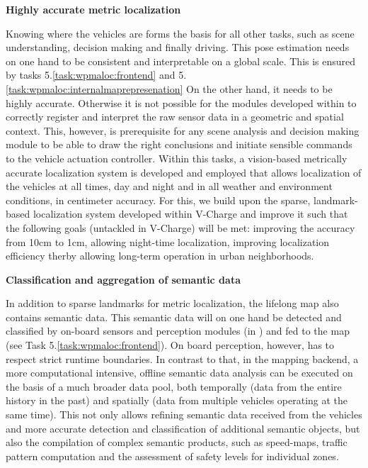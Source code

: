 {\begin{tasks}{\WPMappingNo}
\item {\bf Highly accurate metric localization}
\label{task:wpmaloc:localization}
\taskpartner{\ETHZ}

Knowing where the vehicles are forms the basis for all other tasks, such as scene understanding, decision making and finally driving. This pose estimation needs on one hand to be consistent and interpretable on a global scale. This is ensured by tasks 5.\ref{task:wpmaloc:frontend} and 5.\ref{task:wpmaloc:internalmaprepresenation} On the other hand, it needs to be highly accurate. Otherwise it is not possible for the modules developed within \WPPerception to correctly register and interpret the raw sensor data in a geometric and spatial context. This, however, is prerequisite for any scene analysis and decision making module to be able to draw the right conclusions and initiate sensible commands to the vehicle actuation controller. Within this tasks, a vision-based metrically accurate localization system is developed and employed that allows localization of the vehicles at all times, day and night and in all weather and environment conditions, in centimeter accuracy. For this, we build upon the sparse, landmark-based localization system developed within V-Charge and improve it such that the following goals (untackled in V-Charge) will be met: improving the accuracy from 10cm to 1cm, allowing night-time localization, improving localization efficiency therby allowing long-term operation in urban neighborhoods.


\item {\bf Classification and aggregation of semantic data}
\label{task:wpmaloc:semantic}
\taskpartners{\IBM}{\ETHZ}
  
In addition to sparse landmarks for metric localization, the lifelong map also contains semantic data. This semantic data will on one hand be detected and classified by on-board sensors and perception modules (in \WPPerception{}) and fed to the map (see Task 5.\ref{task:wpmaloc:frontend}). On board perception, however, has to respect strict runtime boundaries. In contrast to that, in the mapping backend, a more computational intensive, offline semantic data analysis can be executed on the basis of a much broader data pool, both temporally (data from the entire history in the past) and spatially (data from multiple vehicles operating at the same time). This not only allows refining semantic data received from the vehicles and more accurate detection and classification of additional semantic objects, but also the compilation of complex semantic products, such as speed-maps, traffic pattern computation and the assessment of safety levels for individual zones.  



\end{tasks}}
